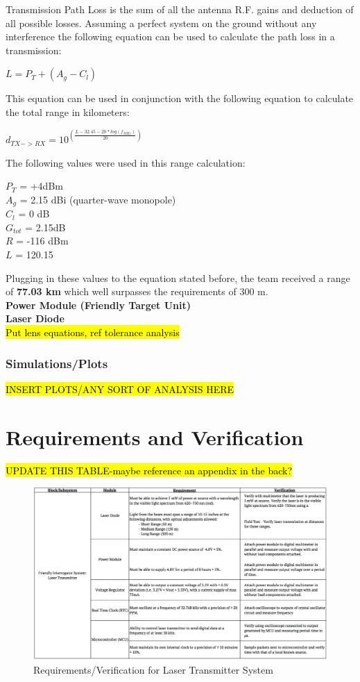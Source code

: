 \documentclass[letterpaper,10pt]{article}
\begin{document}
\begin{spacing}{1.15}
Transmission Path Loss is the sum of all the antenna R.F. gains and deduction of all possible losses. Assuming a perfect system on the ground without any interference the following equation can be used to calculate the path loss in a transmission:
\begin{center}
	$L = P_T + (A_g - C_l)$
\end{center}
This equation can be used in conjunction with the following equation to calculate the total range in kilometers:
\begin{center}
	\large
	$d_{TX->RX} = 10^{\left( \frac{L - 32.45 -20*log(f_{MHz})}{20}\right)}$
\end{center}
The following values were used in this range calculation:
\begin{center}
$P_T$ = +4dBm \\
$A_g$ = 2.15 dBi (quarter-wave monopole) \\
$C_l$ = 0 dB \\ 
$G_{tot}$ =  2.15dB\\
$R$ = -116 dBm \\
$L$ =  120.15\\
\end{center}
Plugging in these values to the equation stated before, the team received a range of \textbf{77.03 km} which well surpasses the requirements of 300 m. \\

\normalsize\textbf{Power Module (Friendly Target Unit)} \\

\normalsize\textbf{Laser Diode} \\
\hl{Put lens equations, ref tolerance analysis}

\subsubsection{Simulations/Plots}
\hl{INSERT PLOTS/ANY SORT OF ANALYSIS HERE}


\section{Requirements and Verification}
\hl{UPDATE THIS TABLE-maybe reference an appendix in the back?}
\begin{figure} [H]
	\centering
	\includegraphics[scale=0.3]{Requirements.png}
	\caption{Requirements/Verification for Laser Transmitter System\label{fig:requirements}}
\end{figure}

\end{spacing}
\end{document}
